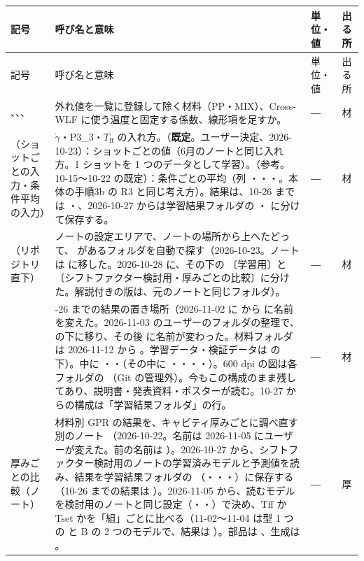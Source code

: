 \documentclass[paper=a4paper,fontsize=10.5pt,line_length=44zw,number_of_lines=38]{jlreq}
\makeatletter
\newcommand{\file}[1]{\texttt{\detokenize{#1}}}
\newcommand{\gd}{\dot{\gamma}}
\newcommand{\Tff}{T_{\mathrm{ff}}}
\newenvironment{symtab}{%
  \begin{longtable}{@{}>{\raggedright\arraybackslash}p{6.5\zw}>{\raggedright\arraybackslash}p{22\zw}>{\raggedright\arraybackslash}p{6\zw}>{\raggedright\arraybackslash}p{4.5\zw}@{}}
  \toprule 記号 & 呼び名と意味 & 単位・値 & 出る所 \\ \midrule \endfirsthead
  \toprule 記号 & 呼び名と意味 & 単位・値 & 出る所 \\ \midrule \endhead
  \bottomrule \endlastfoot}{\end{longtable}}
\makeatother
\begin{document}
\begin{symtab}
\file{OUTLIER_REGISTER}、\file{CWLF_T}、\file{CWLF_FIXED}、\file{USE_LINEAR} & 外れ値を一覧に登録して除く材料（PP・MIX）、Cross-WLF に使う温度と固定する係数、線形項を足すか。 & ― & 材 \\
\file{INPUT_MODE}（ショットごとの入力・条件平均の入力） & $\gd$・P3\_3・$\Tff$ の入れ方。\file{"shot"}（\textbf{既定}。ユーザー決定、2026-10-23）：ショットごとの値（6月のノートと同じ入れ方。1 ショットを 1 つのデータとして学習）。\file{"cond"}（参考。10-15〜10-22 の既定）：条件ごとの平均（列 \file{ln_gd_cm}・\file{ln_P33_cm}・\file{ln_Tff_cm}・\file{Tff_cm}。本体の手順3b の R3 と同じ考え方）。結果は、10-26 までは \file{<材料フォルダ>/<番号>_学習結果/1回目_<材料の名前>_学習結果/ショットごとの入力/}・\file{条件平均の入力/}、2026-10-27 からは学習結果フォルダの \file{全ショット版/}・\file{条件ごとの平均版/} に分けて保存する。 & ― & 材 \\
\file{REPO}（リポジトリ直下） & ノートの設定エリアで、ノートの場所から上へたどって、\file{04_補助スクリプト} があるフォルダを自動で探す（2026-10-23。ノートは \file{01_機械学習コードフォルダ/材料別_温度シフトファクター検討/} に移した。2026-10-28 に、その下の \file{材料別_温度シフト機械学習コード/}〔学習用〕と \file{材料別_温度シフトファクター検討用コード/}〔シフトファクター検討用・厚みごとの比較〕に分けた。解説付きの版は、元のノートと同じフォルダ）。 & ― & 材 \\
\file{1回目_<材料の名前>_学習結果/} & 10-26 までの結果の置き場所（2026-11-02 に \file{<材料フォルダ>_学習結果/} から \file{<材料フォルダ>_学習結果(5all学習データ)/} に名前を変えた。2026-11-03 のユーザーのフォルダの整理で、\file{<材料フォルダ>/<番号>_学習結果/} の下に移り、その後 \file{1回目_…} に名前が変わった。材料フォルダは 2026-11-12 から \file{<材料の名前>(データと結果)/}。学習データ・検証データは \file{<材料フォルダ>/<番号>_学習・検証データ/} の下）。中に \file{データ確認/}・\file{ショットごとの入力/}・\file{条件平均の入力/}（その中に \file{B_Tset/}・\file{B_Tff/}・\file{C/}・\file{比較/}・\file{厚みごとの比較/}）。600 dpi の図は各フォルダの \file{highres/}（Git の管理外）。今もこの構成のまま残してあり、説明書・発表資料・ポスターが読む。10-27 からの構成は「学習結果フォルダ」の行。 & ― & 材 \\
厚みごとの比較（ノート） & 材料別 GPR の結果を、キャビティ厚みごとに調べ直す別のノート \file{材料別_厚みごとの比較_温度シフトファクターの検討_ARD対応Matern52＋線形＋ホワイトノイズ.ipynb}（2026-10-22。名前は 2026-11-05 にユーザーが変えた。前の名前は \file{材料別_温度シフトGPR_ARD対応Matern52＋線形＋ホワイトノイズ_厚みごとの比較.ipynb}）。2026-10-27 から、シフトファクター検討用のノートの学習済みモデルと予測値を読み、結果を学習結果フォルダの \file{<版>/厚みごと/}（\file{学習結果グラフ/}・\file{温度シフトの確認/}・\file{シフトに使う温度/}・\file{厚みごとのモデルと総合の比較/}）に保存する（10-26 までの結果は \file{<番号>_学習結果/1回目_<材料の名前>_学習結果/<入力の取り方>/厚みごとの比較/}）。2026-11-05 から、読むモデルを検討用のノートと同じ設定（\file{SHIFT_COLS}・\file{STRUCTS}・\file{SHIFT_FORMS}）で決め、Tff か Tset かを「組」ごとに比べる（11-02〜11-04 は型 1 つの \file{SHIFT_FORM} と B の 2 つのモデルで、結果は \file{厚みごと/<型>/}）。部品は \file{04_補助スクリプト/mat_thickness.py}、生成は \file{build_mat_thick_nb.py}。 & ― & 厚 \\

\end{symtab}
\end{document}
